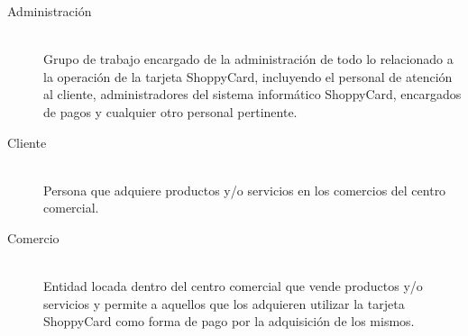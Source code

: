 \begin{description}

\item[Administración] \hfill \\
Grupo de trabajo encargado de la administración de todo lo relacionado a la
operación de la tarjeta ShoppyCard, incluyendo el personal de atención al
cliente, administradores del sistema informático ShoppyCard, encargados de pagos
y cualquier otro personal pertinente.

\item[Cliente] \hfill \\
Persona que adquiere productos y/o servicios en los comercios del centro
comercial.

\item[Comercio] \hfill \\
Entidad locada dentro del centro comercial que vende productos y/o servicios y
permite a aquellos que los adquieren utilizar la tarjeta ShoppyCard como forma
de pago por la adquisición de los mismos.

\end{description}
